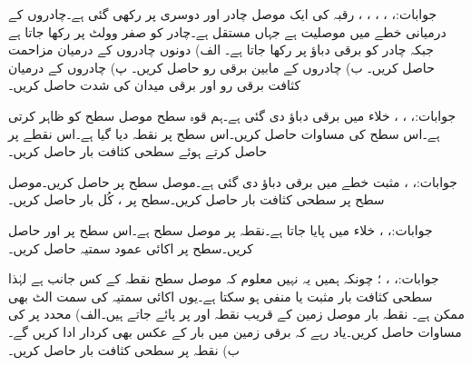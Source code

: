 جوابات:، ، ، ، ، 
رقبہ  کی ایک موصل چادر  اور دوسری  پر رکھی گئی ہے۔چادروں کے درمیانی خطے میں موصلیت  ہے جہاں  مستقل ہے۔چادر  کو صفر وولٹ پر رکھا جاتا ہے جبکہ چادر  کو  برقی دباؤ پر رکھا جاتا ہے۔ الف) دونوں چادروں کے درمیان مزاحمت حاصل کریں۔ ب) چادروں کے مابین برقی رو حاصل کریں۔ پ) چادروں کے درمیان کثافت برقی رو اور برقی میدان کی شدت حاصل کریں۔

جوابات:، ، ،
خلاء میں برقی دباؤ  دی گئی ہے۔ہم قوہ سطح  موصل سطح کو ظاہر کرتی ہے۔اس سطح کی مساوات حاصل کریں۔اس سطح پر نقطہ  دیا گیا ہے۔اس نقطے پر  حاصل کرتے ہوئے سطحی کثافت بار  حاصل کریں۔

جوابات:، ،
مثبت  خطے میں برقی دباؤ  دی گئی ہے۔موصل سطح  پر   حاصل کریں۔موصل سطح پر سطحی کثافت بار حاصل کریں۔سطح پر ،  کُل بار حاصل کریں۔

جوابات:، ، 
خلاء میں  پایا جاتا ہے۔نقطہ  پر موصل سطح ہے۔اس سطح پر  اور  حاصل کریں۔سطح پر اکائی عمود سمتیہ  حاصل کریں۔

جوابات:، ،
 ؛ چونکہ ہمیں یہ نہیں معلوم کہ موصل سطح نقطہ   کے کس جانب ہے لہٰذا سطحی کثافت بار مثبت یا منفی ہو سکتا ہے۔یوں اکائی سمتیہ کی سمت الٹ بھی ممکن ہے۔
نقطہ بار  موصل زمین  کے قریب نقطہ  اور  پر پائے جاتے ہیں۔الف) محدد  پر  کی مساوات حاصل کریں۔یاد رہے کہ برقی زمین میں بار کے عکس بھی کردار ادا کریں گے۔ ب) نقطہ  پر سطحی کثافت بار حاصل کریں۔

